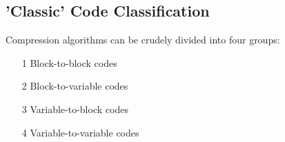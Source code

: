 \begin{frame}
\subsection*{'Classic' Code Classification}

Compression algorithms can be crudely divided into four groups:
\begin{itemize}
\item[1] Block-to-block codes
\item[2] Block-to-variable codes
\item[3] Variable-to-block codes
\item[4] Variable-to-variable codes
\end{itemize}
\end{frame}
